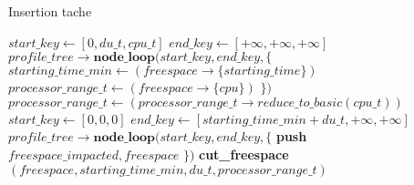 \documentclass{report}
\begin{document}
\begin{algorithm}
\caption{Insertion tache}\label{insertion}
\begin{algorithmic}[1]
	\State $start\_key\gets[0, du\_t, cpu\_t]$
	\State $end\_key\gets[+\infty, +\infty, +\infty]$
	\State
	\State $profile\_tree\rightarrow \textbf{node\_loop}(start\_key, end\_key, \{$
		\State \hspace{\algorithmicindent} $starting\_time\_min\gets (freespace\rightarrow\{starting\_time\})$
		\State \hspace{\algorithmicindent} $processor\_range\_t\gets (freespace\rightarrow\{cpu\})$
		\State \hspace{\algorithmicindent} 
	\State $\})$
	\State {}
	\State $processor\_range\_t\gets (processor\_range\_t\rightarrow reduce\_to\_basic(cpu\_t))$
	\State $start\_key\gets[0, 0, 0]$
	\State
	\State $end\_key\gets[starting\_time\_min + du\_t, +\infty, +\infty]$
	\State $profile\_tree\rightarrow \textbf{node\_loop}(start\_key, end\_key, \{$
		\State \hspace{\algorithmicindent} \textbf{push} $freespace\_impacted, freespace$
		\State \hspace{\algorithmicindent} 
	\State $\})$
	\State
		\State \textbf{cut\_freespace}$(freespace, starting\_time\_min, du\_t, processor\_range\_t)$
	\EndFor
\EndFunction
\end{algorithmic}
\end{algorithm}
\end{document}
